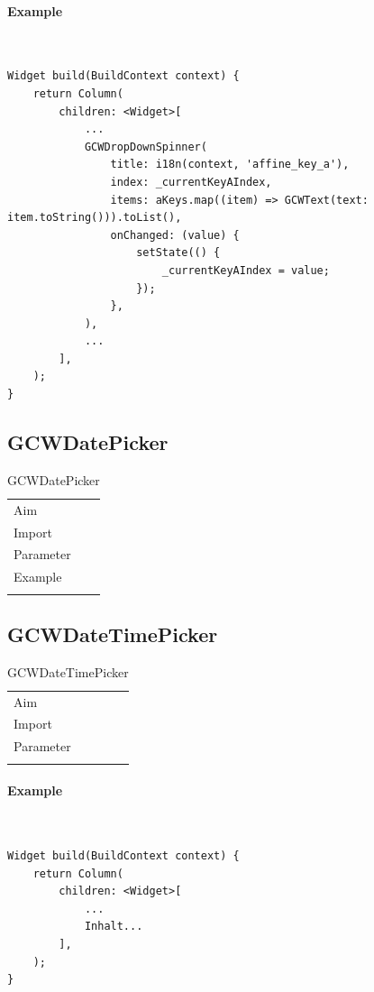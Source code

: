 \paragraph*{Example} \,
\begin{lstlisting}
Widget build(BuildContext context) {
    return Column(
        children: <Widget>[
            ...
            GCWDropDownSpinner(
                title: i18n(context, 'affine_key_a'),
                index: _currentKeyAIndex,
                items: aKeys.map((item) => GCWText(text: item.toString())).toList(),
                onChanged: (value) {
                    setState(() {
                        _currentKeyAIndex = value;
                    });
                },
            ),
            ...
        ],
    );
}
\end{lstlisting}
\label{fig: ExampleGCWDropdownSpinner}

\newpage
\subsection{GCWDatePicker}
\begin{table}[H]
\begin{tabular}[h]{p{2cm}p{9cm}}
    \caption{GCWDatePicker}
    Aim       & \\
    Import    & \\
    Parameter & \\
    Example   & \\
    \label{tab:GCWDatePicker}
\end{tabular}
\end{table}

\newpage
\subsection{GCWDateTimePicker}
\begin{table}[H]
\begin{tabular}[h]{p{2cm}p{9cm}}
    \caption{GCWDateTimePicker}
    Aim       & \\
    Import    & \\
    Parameter & \\
    \label{tab:GCWDateTimePicker}
\end{tabular}
\end{table}
\paragraph*{Example} \,
\begin{lstlisting}
Widget build(BuildContext context) {
    return Column(
        children: <Widget>[
            ...
            Inhalt...
        ],
    );
}
\end{lstlisting}
\label{fig: ExampleGCWDateTimePicker}

